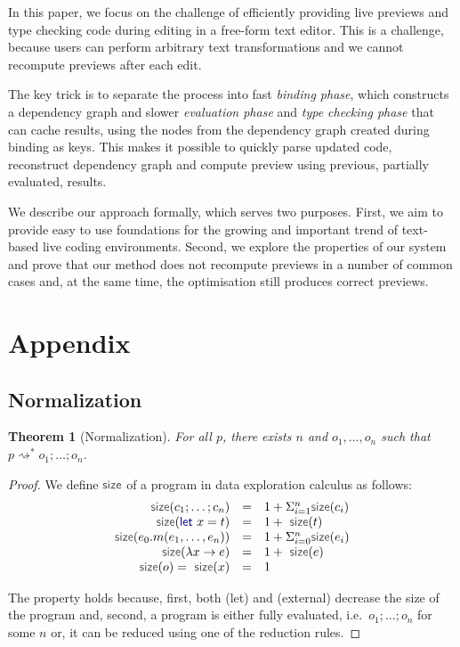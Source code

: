 \documentclass[acmsmall,anonymous,fleqn]{acmart}\settopmatter{printfolios=false,printccs=false,printacmref=false}
\newcounter{thc}
\theoremstyle{plain}
\newtheorem{theorem}[thc]{Theorem}
\theoremstyle{definition}
\newcommand{\ident}[1]{\textnormal{\textcolor{idclr}{\sffamily #1}}}
\newcommand{\kvd}[1]{\textnormal{\textcolor{kvdclr}{\sffamily #1}}}
\newcommand{\rname}[1]{{\sffamily\small(#1)}}
\begin{document}
In this paper, we focus on the challenge of efficiently providing live previews and type checking
code during editing in a free-form text editor. This is a challenge, because users can perform
arbitrary text transformations and we cannot recompute previews after each edit.

The key trick is to separate the process into fast \emph{binding phase},
which constructs a dependency graph and slower \emph{evaluation phase} and \emph{type checking phase}
that can cache results, using the nodes from the dependency graph created during binding as keys.
This makes it possible to quickly parse updated code, reconstruct dependency graph and compute
preview using previous, partially evaluated, results.

We describe our approach formally, which serves two purposes. First, we aim to provide easy to
use foundations for the growing and important trend of text-based live coding environments.
Second, we explore the properties of our system and prove that our method does not recompute
previews in a number of common cases and, at the same time, the optimisation still produces
correct previews.



\newpage
\appendix

\section{Appendix}

\subsection{Normalization}
\label{sec:app-normalization}

\begin{theorem}[Normalization]
For all $p$, there exists $n$ and $o_1, \ldots, o_n$ such that $p\rightsquigarrow^{*} o_1;\ldots;o_n$.
\end{theorem}
\begin{proof}
We define $\ident{size}$ of a program in data exploration calculus as follows:
\begin{equation}
\begin{array}{rcl}
\ident{size}(c_1; \ldots; c_n) &=& 1 + \Sigma^{n}_{i=1} \ident{size}(c_i)\\
\ident{size}(\kvd{let}~x=t) &=& 1 + \ident{size}(t)\\
\ident{size}(e_0.m(e_1, \ldots, e_n)) &=& 1 + \Sigma^{n}_{i=0} \ident{size}(e_i)\\
\ident{size}(\lambda x\rightarrow e) &=& 1 + \ident{size}(e)\\
\ident{size}(o) = \ident{size}(x) &=& 1\\
\end{array}
\end{equation}

\noindent
The property holds because, first, both \rname{let} and \rname{external} decrease the \ident{size}
of the program and, second, a program is either fully evaluated, i.e.~$o_1;\ldots;o_n$ for some $n$
or, it can be reduced using one of the reduction rules.
\end{proof}
\end{document}
